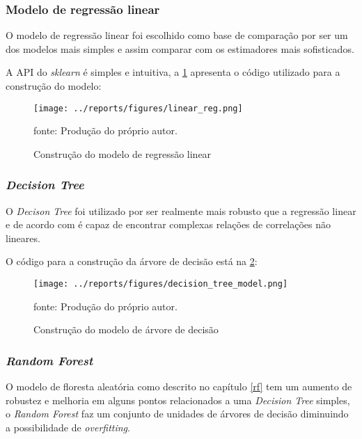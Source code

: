 \documentclass[
  12pt,		%
  a4paper,	%
  openright,%
  oneside,	%
  chapter=TITLE,		%
  section=TITLE,		%
  english,	%
  french,	%
  spanish,	%
  brazil	%
]{abntex2}
\begin{document}
    \subsubsection{Modelo de regressão linear}

    O modelo de regressão linear foi escolhido como base de comparação por ser um dos modelos mais simples e assim
    comparar com os estimadores mais sofisticados.

    A API do \textit{sklearn} é simples e intuitiva, a \ref*{lin_reg} apresenta o código utilizado para a construção do modelo:

    \begin{figure}[ht]
        \centering
        \caption{Construção do modelo de regressão linear}
        \texttt{[image: ../reports/figures/linear\_reg.png]}
        \label{lin_reg}
        \par
        {\small fonte: Produção do próprio autor.}
    \end{figure}

    \subsubsection{\textit{Decision Tree}}
    
    O \textit{Decison Tree} foi utilizado por ser realmente mais robusto que a regressão linear e de acordo com \cite[]{hands_on_ml} é capaz de encontrar
    complexas relações de correlações não lineares.

    O código para a construção da árvore de decisão está na \ref*{tree_reg}:

    \begin{figure}[ht]
        \centering
        \caption{Construção do modelo de árvore de decisão}
        \texttt{[image: ../reports/figures/decision\_tree\_model.png]}
        \label{tree_reg}
        \par
        {\small fonte: Produção do próprio autor.}
    \end{figure}

    \subsubsection{\textit{Random Forest}}

    O modelo de floresta aleatória como descrito no capítulo \ref*{rf} tem um aumento de robustez e melhoria em alguns pontos
    relacionados a uma \textit{Decision Tree} simples, o \textit{Random Forest} faz um conjunto de unidades de árvores de decisão
    diminuindo a possibilidade de \textit{overfitting}.
\end{document}
